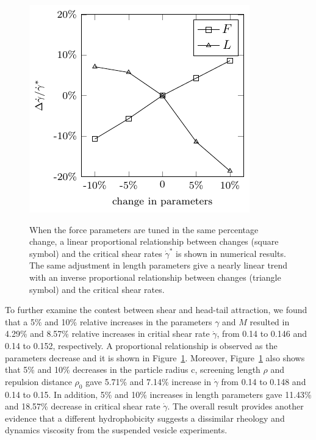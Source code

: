 \documentclass[prb,preprint,showpacs,preprintnumbers,amsmath,amssymb,longbibliography]{revtex4-1}
\begin{document}


\begin{figure}[t]
\begin{center}
  \includegraphics[height=0.3\textheight]{ChangeLengthForce.pdf}
\end{center}
\begin{caption}{\label{fig:PramChange}
When the force parameters are tuned in the same percentage change, a linear proportional relationship between changes (square symbol) and the critical shear rates $\dot\gamma^*$ is shown in numerical results. The same adjustment in length parameters give a nearly linear trend with an inverse proportional relationship between changes (triangle symbol) and the critical shear rates.}
\end{caption}
\end{figure}

To further examine the contest between shear and head-tail attraction, we found that a 5\% and 10\% relative increases in the parameters $\gamma$ and
$M$ resulted in 4.29\% and 8.57\% relative increases in critial shear rate $\dot\gamma$, from 0.14 to 0.146 and 0.14 to 0.152, respectively. 
A proportional relationship is observed as the parameters decrease and it is shown in Figure~\ref{fig:PramChange}.
Moreover, Figure~\ref{fig:PramChange} also shows that 5\% and 10\% decreases in the particle radius c, screening length $\rho$ and repulsion distance $\rho_0$ gave 5.71\%  and 7.14\% increase in $\dot\gamma$ from 0.14 to 0.148 and 0.14 to 0.15.
In addition, 5\% and 10\% increases in length parameters gave 11.43\% and 18.57\% decrease in critical shear rate $\dot\gamma$.
The overall result provides another evidence that a different hydrophobicity suggests a dissimilar rheology and dynamics viscosity from the suspended vesicle experiments.
\end{document}

